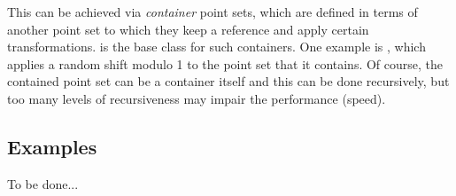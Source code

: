 This can be achieved via \emph{container} point sets, which are defined
in terms of another point set to which they keep a reference
and apply certain transformations.
 is the base
 class for such containers.
One example is ,
 which applies a random shift
modulo 1 to the point set that it contains.
Of course, the contained point set can be a container itself and this
can be done recursively, but too many levels of recursiveness may impair
the performance (speed).



\subsection*{Examples}

 To be done...



